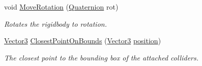 \begin{DoxyCompactItemize}
void \mbox{\hyperlink{class_lua_1_1_rigidbody_a064bd1441d0a8d7e636619c87a98f7cf}{Move\+Rotation}} (\mbox{\hyperlink{class_lua_1_1_quaternion}{Quaternion}} rot)
\begin{DoxyCompactList}\small\item\em Rotates the rigidbody to rotation. \end{DoxyCompactList}\item 
\mbox{\hyperlink{class_lua_1_1_vector3}{Vector3}} \mbox{\hyperlink{class_lua_1_1_rigidbody_a267bf6dacb4ef9d2aeb0c798d2460245}{Closest\+Point\+On\+Bounds}} (\mbox{\hyperlink{class_lua_1_1_vector3}{Vector3}} \mbox{\hyperlink{class_lua_1_1_rigidbody_a9bef020808bd389b43ac5d2f7d429dc9}{position}})
\begin{DoxyCompactList}\small\item\em The closest point to the bounding box of the attached colliders. \end{DoxyCompactList}\end{DoxyCompactItemize}
